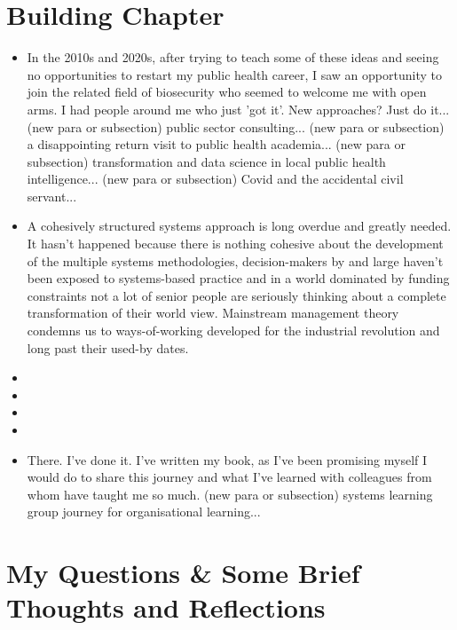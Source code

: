 \section*{Building Chapter}
\begin{itemize}
	\item {} In the 2010s and 2020s, after trying to teach some of these ideas and seeing no opportunities to restart my public health career, I saw an opportunity to join the related field of biosecurity who seemed to welcome me with open arms. I had people around me who just 'got it'. New approaches? Just do it...  (new para or subsection) public sector consulting... (new para or subsection) a disappointing return visit to public health academia... (new para or subsection) transformation and data science in local public health intelligence... (new para or subsection) Covid and the accidental civil servant...
	\item {} A cohesively structured systems approach is long overdue and greatly needed. It hasn't happened because there is nothing cohesive about the development of the multiple systems methodologies, decision-makers by and large haven't been exposed to systems-based practice and in a world dominated by funding constraints not a lot of senior people are seriously thinking about a complete transformation of their world view. Mainstream management theory condemns us to ways-of-working developed for the industrial revolution and long past their used-by dates.  
	\item {}
	\item {}
	\item {}
	\item {}
	\item {} There. I've done it. I've written my book, as I've been promising myself I would do to share this journey and what I've learned with colleagues from whom have taught me so much. (new para or subsection) systems learning group journey for organisational learning...
\end{itemize}

\section*{My Questions \& Some Brief Thoughts and Reflections}
